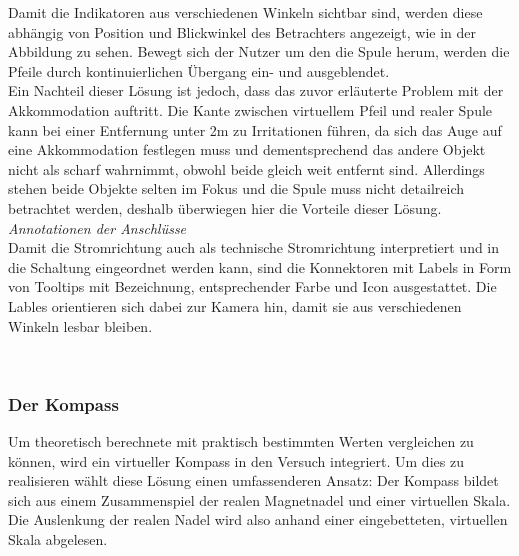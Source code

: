 Damit die Indikatoren aus verschiedenen Winkeln sichtbar sind, werden diese abhängig von Position und Blickwinkel des Betrachters angezeigt, wie in der Abbildung zu sehen. Bewegt sich der Nutzer um den die Spule herum, werden die Pfeile durch kontinuierlichen Übergang ein- und ausgeblendet.\\

Ein Nachteil dieser Lösung ist jedoch, dass das zuvor erläuterte Problem mit der Akkommodation auftritt. Die Kante zwischen virtuellem Pfeil und realer Spule kann bei einer Entfernung unter 2m zu Irritationen führen, da sich das Auge auf eine Akkommodation festlegen muss und dementsprechend das andere Objekt nicht als scharf wahrnimmt, obwohl beide gleich weit entfernt sind. Allerdings stehen beide Objekte selten im Fokus und die Spule muss nicht detailreich betrachtet werden, deshalb überwiegen hier die Vorteile dieser Lösung.\\

\textit{Annotationen der Anschlüsse}\\
Damit die Stromrichtung auch als technische Stromrichtung interpretiert und in die Schaltung eingeordnet werden kann, sind die Konnektoren mit Labels in Form von Tooltips mit Bezeichnung, entsprechender Farbe und Icon ausgestattet. Die Lables orientieren sich dabei zur Kamera hin, damit sie aus verschiedenen Winkeln lesbar bleiben.\\

\vspace{8px}
\begin{center}
	\\
\end{center}
\vspace{6px}

\subsubsection{Der Kompass} 
\label{sec-4-2-4}
Um theoretisch berechnete mit praktisch bestimmten Werten vergleichen zu können, wird ein virtueller Kompass in den Versuch integriert. Um dies zu realisieren wählt diese Lösung einen umfassenderen Ansatz: Der Kompass bildet sich aus einem Zusammenspiel der realen Magnetnadel und einer virtuellen Skala. Die Auslenkung der realen Nadel wird also anhand einer eingebetteten, virtuellen Skala abgelesen.\\

